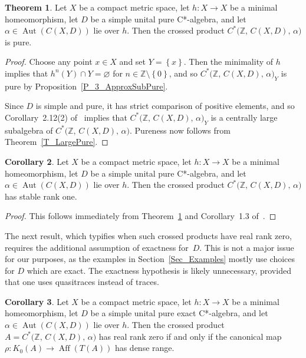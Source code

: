 \documentclass[10pt]{amsart}
\numberwithin{equation}{section}
\theoremstyle{definition}
\newtheorem{thm}{Theorem}[section]
\newtheorem{cor}[thm]{Corollary}
\newcommand{\af}{\alpha}
\newcommand{\Z}{{\mathbb{Z}}}
\newcommand{\Aut}{{\operatorname{Aut}}}
\newcommand{\Aff}{{\operatorname{Aff}}}
\newcommand{\set}[1]{\left\{ #1 \right\}}
\begin{document}
\begin{thm}\label{T_4_PureCrossProd}
Let $X$ be a compact metric space, let $h \colon X \to X$ be a
minimal homeomorphism, let $D$ be a simple unital pure C*-algebra,
and let $\af \in \Aut (C (X,D))$ lie over $h$.
Then the crossed
product $C^* \bigl( \Z, \, C (X, D), \, \af \bigr)$ is pure.
\end{thm}

\begin{proof}
Choose any point $x \in X$ and set $Y = \set{x}$.
Then
the minimality of $h$ implies that $h^{n}(Y) \cap Y =
\varnothing$ for $n \in \Z \setminus \set{0}$, and so
$C^* \bigl( \Z, \, C (X, D), \, \af \bigr)_{Y}$ is pure
by Proposition~\ref{P_3_ApproxSubPure}.

Since $D$ is simple and pure, it has strict comparison
of positive elements, and so Corollary~2.12(2)
of~\cite{ArBcPh2} implies that
$C^* \bigl( \Z, \, C (X, D), \, \af \bigr)_{Y}$
is a centrally large subalgebra of
$C^* \bigl( \Z, \, C (X, D), \, \af \bigr)$.
Pureness now follows from Theorem~\ref{T_LargePure}.
\end{proof}

\begin{cor}\label{C_5_CrossProdSR1}
Let $X$ be a compact metric space, let $h \colon X \to X$ be a
minimal homeomorphism, let $D$ be a simple unital pure C*-algebra,
and let $\af \in \Aut (C (X,D))$ lie over $h$.
Then the crossed
product $C^* \bigl( \Z, \, C (X, D), \, \af \bigr)$ has stable
rank one.
\end{cor}

\begin{proof}
This follows immediately from Theorem~\ref{T_4_PureCrossProd}
and Corollary~1.3 of~\cite{HLin}.
\end{proof}

The next result, which typifies when such crossed products have
real rank zero, requires the additional assumption of exactness
for~$D$.
This is not a major issue for our purposes, as the
examples in Section~\ref{Sec_Examples} mostly use choices for $D$
which are exact.
The exactness hypothesis is likely unnecessary,
provided that one uses quasitraces instead of traces.

\begin{cor}\label{C_6_CrossProdRR0}
Let $X$ be a compact metric space, let $h \colon X \to X$ be a
minimal homeomorphism, let $D$ be a simple unital pure exact
C*-algebra, and let $\af \in \Aut (C (X,D))$ lie over $h$.
Then the crossed product
$A = C^* \bigl( \Z, \, C (X, D), \, \af \bigr)$
has real rank zero if and only if the canonical map
$\rho \colon K_{0}(A) \to \Aff (T(A))$ has dense range.
\end{cor}
\end{document}
